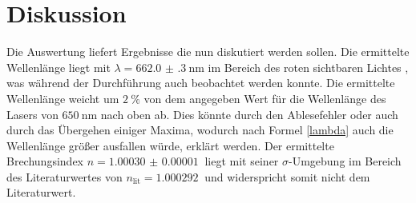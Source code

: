 
\section{Diskussion}
\label{sec:Diskussion}
Die Auswertung liefert Ergebnisse die nun diskutiert werden sollen. Die ermittelte Wellenlänge liegt mit $\lambda = \SI{662.0(3)}{\nano\meter}$ im Bereich des roten sichtbaren Lichtes \cite{sichtbaresSpektrum}, was während der Durchführung auch beobachtet werden konnte. Die ermittelte Wellenlänge weicht um $\SI{2}{\percent}$ von dem angegeben Wert für die Wellenlänge des Lasers von $\SI{650}{\nano\meter}$ nach oben ab. Dies könnte durch den Ablesefehler oder auch durch das Übergehen einiger Maxima, wodurch nach Formel \eqref{lambda} auch die Wellenlänge größer ausfallen würde, erklärt werden. Der ermittelte Brechungsindex $n= \SI{1.00030(1)}{}$ liegt mit seiner $\sigma$-Umgebung im Bereich des Literaturwertes von $n_\text{lit}=\SI{1.000 292}{}$ \cite{nLuft} und widerspricht somit nicht dem Literaturwert.